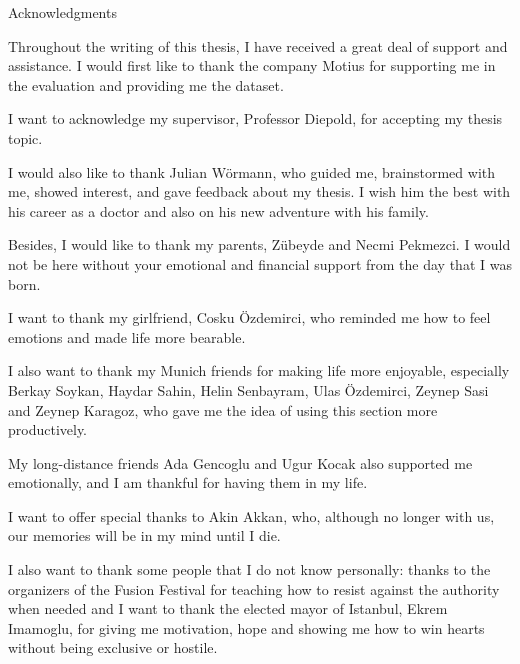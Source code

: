 \thispagestyle{empty}

\vspace*{20mm}

\begin{center}
{ Acknowledgments}
\end{center}

\vspace{10mm}

Throughout the writing of this thesis, I have received a great deal of support and assistance. I would first like to thank the company Motius for supporting me in the evaluation and providing me the dataset.

I want to acknowledge my supervisor, Professor Diepold, for accepting my thesis topic.

I would also like to thank Julian Wörmann, who guided me, brainstormed with me, showed interest, and gave feedback about my thesis. I wish him the best with his career as a doctor and also on his new adventure with his family.

Besides, I would like to thank my parents, Zübeyde and Necmi Pekmezci. I would not be here without your emotional and financial support from the day that I was born.

I want to thank my girlfriend, Cosku Özdemirci, who reminded me how to feel emotions and made life more bearable.

I also want to thank my Munich friends for making life more enjoyable, especially Berkay Soykan, Haydar Sahin, Helin Senbayram, Ulas Özdemirci, Zeynep Sasi and Zeynep Karagoz, who gave me the idea of using this section more productively.

My long-distance friends Ada Gencoglu and Ugur Kocak also supported me emotionally, and I am thankful for having them in my life.

I want to offer special thanks to Akin Akkan, who, although no longer with us, our memories will be in my mind until I die.

I also want to thank some people that I do not know personally: thanks to the organizers of the Fusion Festival for teaching how to resist against the authority when needed and I want to thank the elected mayor of Istanbul, Ekrem Imamoglu, for giving me motivation, hope and showing me how to win hearts without being exclusive or hostile.


\cleardoublepage{}
